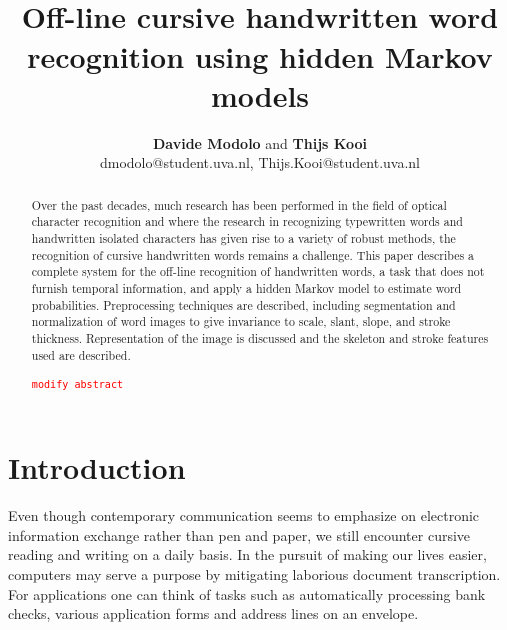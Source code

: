 \documentclass[conference]{IEEEtran}
\newcommand{\todo}[1]{\textcolor{red}{\texttt{#1}}}
\begin{document}
\title{\ \\ \LARGE\bf Off-line cursive handwritten word recognition using hidden Markov models}
\author{{\bf Davide Modolo} and {\bf Thijs Kooi}\\ dmodolo@student.uva.nl, Thijs.Kooi@student.uva.nl}
\maketitle
\begin{abstract}
Over the past decades, much research has been performed in the field of optical character recognition and where the research in recognizing typewritten words and handwritten isolated characters has given rise to a variety of robust methods, the recognition of cursive handwritten words remains a challenge. This paper describes a complete system for the off-line recognition of handwritten words, a task that does not furnish temporal information, and apply a hidden Markov model to estimate word probabilities. Preprocessing techniques are described, including segmentation and normalization of word images to give invariance to scale, slant, slope, and stroke thickness. Representation of the image is discussed and the skeleton and stroke features used are described.

\todo{modify abstract}
\end{abstract}
\section{Introduction}
Even though contemporary communication seems to emphasize on electronic information exchange rather than pen and paper, we still encounter cursive reading and writing on a daily basis. In the pursuit of making our lives easier, computers may serve a purpose by mitigating laborious document transcription. For applications one can think of tasks such as automatically processing bank checks, various application forms and address lines on an envelope.
\end{document}
